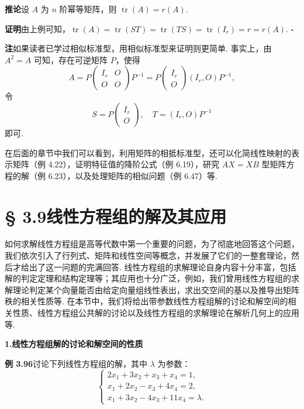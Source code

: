 \documentclass[UTF8,12pt,a4paper,fontset=fandol]{ctexart}
\begin{document}
\noindent\textbf{推论}\quad 设 $A$ 为 $n$ 阶幂等矩阵，则 $\operatorname{tr}(A)=r(A)$.

\noindent\textbf{证明}\quad 由上例可知，$\operatorname{tr}(A)=\operatorname{tr}(ST)=\operatorname{tr}(TS)=\operatorname{tr}(I_r)=r=r(A)$. $\square$

\noindent\textbf{注}\quad 如果读者已学过相似标准型，用相似标准型来证明则更简单. 事实上，由 $A^2=A$ 可知，存在可逆矩阵 $P$，使得
\[
A=P\begin{pmatrix}I_r&O\\O&O\end{pmatrix}P^{-1}
=P\begin{pmatrix}I_r\\O\end{pmatrix}(I_r,O)P^{-1},
\]
令
\[
S=P\begin{pmatrix}I_r\\O\end{pmatrix},\quad T=(I_r,O)P^{-1}
\]
即可.

在后面的章节中我们可以看到，利用矩阵的相抵标准型，还可以化简线性映射的表示矩阵（例 4.22），证明特征值的降阶公式（例 6.19），研究 $AX=XB$ 型矩阵方程的解（例 6.23），以及处理矩阵的相似问题（例 6.47）等.

\section*{§ 3.9\quad 线性方程组的解及其应用}

如何求解线性方程组是高等代数中第一个重要的问题，为了彻底地回答这个问题，我们依次引入了行列式、矩阵和线性空间等概念，并发展了它们的一整套理论，然后才给出了这一问题的完满回答. 线性方程组的求解理论自身内容十分丰富，包括解的判定定理和结构定理等；其应用也十分广泛，例如，我们曾用线性方程组的求解理论判定某个向量能否由给定向量组线性表出，求出交空间的基以及推导出矩阵秩的相关性质等. 在本节中，我们将给出带参数线性方程组解的讨论和解空间的相关性质、线性方程组公共解的讨论以及线性方程组的求解理论在解析几何上的应用等.

\noindent\textbf{1.\quad 线性方程组解的讨论和解空间的性质}

\noindent\textbf{例 3.96}\quad 讨论下列线性方程组的解，其中 $\lambda$ 为参数：
\[
\begin{cases}
2x_1+3x_2+x_3+x_4=1,\\
x_1+2x_2-x_3+4x_4=2,\\
x_1+3x_2-4x_3+11x_4=\lambda.
\end{cases}
\]
\end{document}
